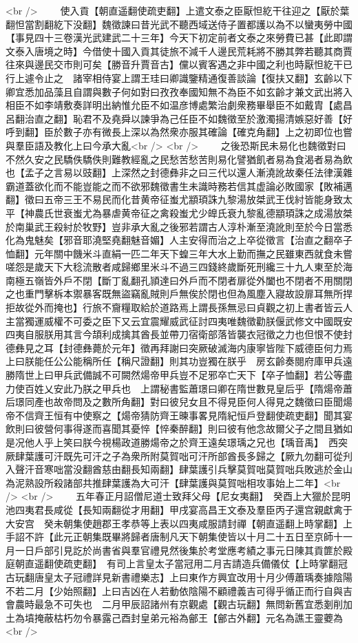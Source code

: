 <br />
　　使入貢【朝直遥翻使疏吏翻】上遣文泰之臣厭怛紇干往迎之【厭於葉翻怛當割翻紇下没翻】魏徵諫曰昔光武不聽西域送侍子置都護以為不以蠻夷勞中國【事見四十三卷漢光武建武二十三年】今天下初定前者文泰之來勞費已甚【此即謂文泰入唐境之時】今借使十國入貢其徒旅不減千人邊民荒耗將不勝其弊若聽其商賈往來與邊民交市則可矣【勝音升賈音古】儻以賓客遇之非中國之利也時厭怛紇干已行上遽令止之　諸宰相侍宴上謂王珪曰卿識鑒精通復善談論【復扶又翻】玄齡以下卿宜悉加品藻且自謂與數子何如對曰孜孜奉國知無不為臣不如玄齡才兼文武出將入相臣不如李靖敷奏詳明出納惟允臣不如温彦博處繁治劇衆務畢舉臣不如戴胄【處昌呂翻治直之翻】恥君不及堯舜以諫爭為己任臣不如魏徵至於激濁揚清嫉惡好善【好呼到翻】臣於數子亦有微長上深以為然衆亦服其確論【確克角翻】上之初即位也嘗與羣臣語及教化上曰今承大亂<br />
<br />
　　之後恐斯民未易化也魏徵對曰不然久安之民驕佚驕佚則難教經亂之民愁苦愁苦則易化譬猶飢者易為食渴者易為飲也【孟子之言易以豉翻】上深然之封德彝非之曰三代以還人漸澆訛故秦任法律漢雜霸道蓋欲化而不能豈能之而不欲邪魏徵書生未識時務若信其虚論必敗國家【敗補邁翻】徵曰五帝三王不易民而化昔黄帝征蚩尤顓頊誅九黎湯放桀武王伐紂皆能身致太平【神農氏世衰蚩尤為暴虐黄帝征之禽殺蚩尤少皥氏衰九黎亂德顓頊誅之成湯放桀於南巢武王殺紂於牧野】豈非承大亂之後邪若謂古人淳朴漸至澆訛則至於今日當悉化為鬼魅矣【邪音耶澆堅堯翻魅音媚】人主安得而治之上卒從徵言【治直之翻卒子恤翻】元年關中饑米斗直絹一匹二年天下蝗三年大水上勤而撫之民雖東西就食未嘗嗟怨是歲天下大稔流散者咸歸鄉里米斗不過三四錢終歲斷死刑纔三十九人東至於海南極五嶺皆外戶不閉【斷丁亂翻孔頴達曰外戶而不閉者扉從外闔也不閉者不用關閉之也重門擊柝本禦暴客既無盜竊亂賊則戶無俟於閉也但為風塵入寢故設扉耳無所捍拒故從外而掩也】行旅不齎糧取給於道路焉上謂長孫無忌曰貞觀之初上書者皆云人主當獨運威權不可委之臣下又云宜震耀威武征討四夷唯魏徵勸朕偃武修文中國既安四夷自服朕用其言今頡利成擒其酋長並帶刀宿衛部落皆襲衣冠徵之力也但恨不使封德彝見之耳【封德彝薨於元年】徵再拜謝曰突厥破滅海内康寧皆陛下威德臣何力焉上曰朕能任公公能稱所任【稱尺證翻】則其功豈獨在朕乎　房玄齡奏閱府庫甲兵遠勝隋世上曰甲兵武備誠不可闕然煬帝甲兵豈不足邪卒亡天下【卒子恤翻】若公等盡力使百姓乂安此乃朕之甲兵也　上謂秘書監蕭璟曰卿在隋世數見皇后乎【隋煬帝蕭后璟同產也故帝問及之數所角翻】對曰彼兒女且不得見臣何人得見之魏徵曰臣聞煬帝不信齊王恒有中使察之【煬帝猜防齊王暕事畧見隋紀恒戶登翻使疏吏翻】聞其宴飲則曰彼營何事得遂而喜聞其憂悴【悴秦醉翻】則曰彼有他念故爾父子之間且猶如是况他人乎上笑曰朕今視楊政道勝煬帝之於齊王遠矣璟瑀之兄也【瑀音禹】　西突厥肆葉護可汗既先可汗之子為衆所附莫賀咄可汗所部酋長多歸之【厥九勿翻可從刋入聲汗音寒咄當没翻酋慈由翻長知兩翻】肆葉護引兵擊莫賀咄莫賀咄兵敗逃於金山為泥熟設所殺諸部共推肆葉護為大可汗【肆葉護與莫賀咄相攻事始上二年】<br />
<br />
　　五年春正月詔僧尼道士致拜父母【尼女夷翻】　癸酉上大獵於昆明池四夷君長咸從【長知兩翻從才用翻】甲戌宴高昌王文泰及羣臣丙子還宫親獻禽于大安宫　癸未朝集使趙郡王孝恭等上表以四夷咸服請封禪【朝直遥翻上時掌翻】上手詔不許【此元正朝集既畢將歸者唐制凡天下朝集使皆以十月二十五日至京師十一月一日戶部引見訖於尚書省與羣官禮見然後集於考堂應考績之事元日陳其貢篚於殿庭朝直遥翻使疏吏翻】　有司上言皇太子當冠用二月吉請造兵備儀仗【上時掌翻冠古玩翻唐皇太子冠禮詳見新書禮樂志】上曰東作方興宜改用十月少傅蕭瑀奏據陰陽不若二月【少始照翻】上曰吉凶在人若動依陰陽不顧禮義吉可得乎循正而行自與吉會農時最急不可失也　二月甲辰詔諸州有京觀處【觀古玩翻】無問新舊宜悉剗削加土為墳掩蔽枯朽勿令暴露己酉封皇弟元裕為鄶王【鄶古外翻】元名為譙王靈蘷為<br />
